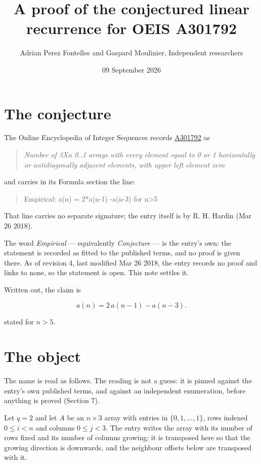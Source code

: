 \documentclass[11pt]{article}
\title{A proof of the conjectured linear recurrence for OEIS A301792}
\author{Adrian Perez Fontelles and Gaspard Moulinier, Independent researchers}
\date{09 September 2026}
\theoremstyle{definition}
\begin{document}
\maketitle
\section{The conjecture}

The Online Encyclopedia of Integer Sequences records \href{https://oeis.org/A301792}{A301792} as

\begin{quote}\itshape Number of 3Xn 0..1 arrays with every element equal to 0 or 1 horizontally or antidiagonally adjacent elements, with upper left element zero\end{quote}

and carries in its Formula section the line:

\begin{quote}\ttfamily Empirical: a(n) = 2*a(n-1) -a(n-3) for n>5\end{quote}

That line carries no separate signature; the entry itself is by R. H. Hardin (Mar 26 2018).

The word {\itshape Empirical} --- equivalently {\itshape Conjecture} --- is the entry's own: the statement is recorded as fitted to the published terms, and no proof is given there. As of revision 4, last modified Mar 26 2018, the entry records no proof and links to none, so the statement is open. This note settles it.

Written out, the claim is

\[a(n) = 2\,a(n-1) - a(n-3).\]

stated for $n > 5$.

\section{The object}

The name is read as follows. The reading is not a guess: it is pinned against the entry's own published terms, and against an independent enumeration, before anything is proved (Section 7).

Let $q = 2$ and let $A$ be an $n \times 3$ array with entries in $\{0,1,\dots,1\}$, rows indexed $0 \le i < n$ and columns $0 \le j < 3$. The entry writes the array with its number of rows fixed and its number of columns growing; it is transposed here so that the growing direction is downwards, and the neighbour offsets below are transposed with it.
\end{document}
